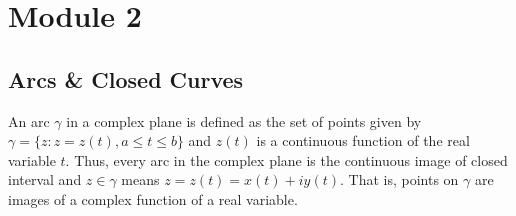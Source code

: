 

\section{Module 2}
\subsection{Arcs \& Closed Curves}
	An arc $\gamma$ in a complex plane is defined as the set of points given by $\gamma = \{ z : z = z(t), a \le t \le b \}$ and $z(t)$ is a continuous function of the real variable $t$.
	Thus, every arc in the complex plane is the continuous image of closed interval and $z \in \gamma$ means $z = z(t) = x(t) + iy(t)$.
	That is, points on $\gamma$ are images of a complex function of a real variable.

